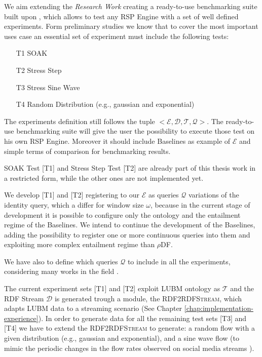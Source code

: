 \noindent We aim extending the \textit{Research Work} creating a ready-to-use benchmarking suite built upon \namens, which allows to test any RSP Engine with a set of well defined experiments. Form preliminary studies we know that to cover the most important uses case an essential set of experiment must include the following tests:
\begin{itemize}
\item[T1] SOAK
\item[T2] Stress Step
\item[T3] Stress Sine Wave
\item[T4] Random Distribution (e.g., gaussian and exponential)
\end{itemize}

The experiments definition still follows the tuple $<\mathcal{E},\mathcal{D},\mathcal{T},\mathcal{Q}>$. The ready-to-use benchmarking suite will give the user the possibility to execute those test on his own RSP Engine. Moreover it should include \name Baselines as example of $\mathcal{E}$ and simple terms of comparison for benchmarking results.

SOAK Test [T1] and Stress Step Test [T2] are already part of this thesis work in a restricted form, while the other ones are not implemented yet. 

We develop [T1] and [T2] registering to our $\mathcal{E}$ as queries $\mathcal{Q}$ variations of the identity query, which a differ for window size $\omega$, because in the current stage of development it is possible to configure only the ontology and the entailment regime of the Baselines. We intend to continue the development of the Baselines, adding the possibility to register one or more continuous queries into them and exploiting more complex entailment regime than $\rho$DF. 

We have also to define which queries $\mathcal{Q}$ to include in all the experiments, considering many works in the field \cite{DBLP:conf/esws/ScharrenbachUMVB13, Zhang2012, LePhuoc2012c, DBLP:conf/semweb/DellAglioCBCV13}.

The current experiment sets [T1] and [T2] exploit LUBM ontology as $\mathcal{T}$ and the RDF Stream $\mathcal{D}$ is generated trough a module, the \textsc{RDF2RDFStream}, which adapts LUBM data to a streaming scenario (See Chapter \ref{chap:implementation-experience}). In order to generate data for all the remaining test sets [T3] and [T4] we have to extend the \textsc{RDF2RDFStream} to generate: a random flow with a given distribution (e.g., gaussian and exponential), and a sine wave flow (to mimic the periodic changes in the flow rates observed on social media streams \cite{DBLP:conf/semweb/BalduiniVDTPC13}).

